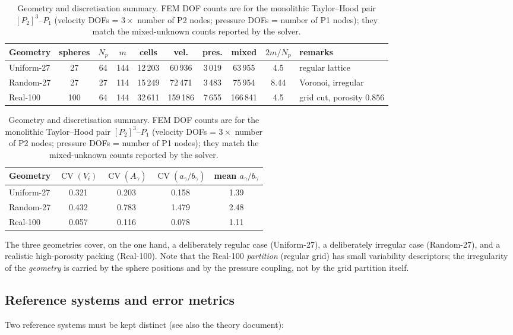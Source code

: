 \documentclass[11pt,a4paper]{article}
\newcommand{\cov}[1]{\operatorname{CV}\left(#1\right)}
\begin{document}
\begin{table}[t]
  \centering
  \footnotesize
  \caption{Geometry and discretisation summary.  FEM DOF counts are for
    the monolithic Taylor--Hood pair $[P_2]^3$--$P_1$ (velocity DOFs =
    $3\times$ number of P2 nodes; pressure DOFs = number of P1 nodes);
    they match the mixed-unknown counts reported by the solver.}
  \label{tab:geometry}
  \begin{tabular}{lccccccccl}
    \toprule
    Geometry & spheres & $N_p$ & $m$ & cells & vel. & pres. &
    mixed & $2m/N_p$ & remarks \\
    \midrule
    Uniform-27 & 27 & 64 & 144 & 12\,203 & 60\,936 & 3\,019 &
    63\,955 & 4.5 & regular lattice \\
    Random-27  & 27 & 27 & 114 & 15\,249 & 72\,471 & 3\,483 &
    75\,954 & 8.44 & Voronoi, irregular \\
    Real-100   & 100 & 64 & 144 & 32\,611 & 159\,186 & 7\,655 &
    166\,841 & 4.5 & grid cut, porosity $0.856$ \\
    \bottomrule
  \end{tabular}
  \medskip
  \begin{tabular}{lcccc}
    \toprule
    Geometry & $\cov{V_i}$ & $\cov{A_\gamma}$ & $\cov{a_\gamma/b_\gamma}$ &
    mean $a_\gamma/b_\gamma$ \\
    \midrule
    Uniform-27 & 0.321 & 0.203 & 0.158 & 1.39 \\
    Random-27  & 0.432 & 0.783 & 1.479 & 2.48 \\
    Real-100   & 0.057 & 0.116 & 0.078 & 1.11 \\
    \bottomrule
  \end{tabular}
\end{table}

The three geometries cover, on the one hand, a deliberately regular
case (Uniform-27), a deliberately irregular case (Random-27), and a
realistic high-porosity packing (Real-100).  Note that the Real-100
\emph{partition} (regular grid) has small variability descriptors; the
irregularity of the \emph{geometry} is carried by the sphere positions
and by the pressure coupling, not by the grid partition itself.

\subsection{Reference systems and error metrics}
\label{sec:references}

Two reference systems must be kept distinct (see also the theory
document):
\end{document}
